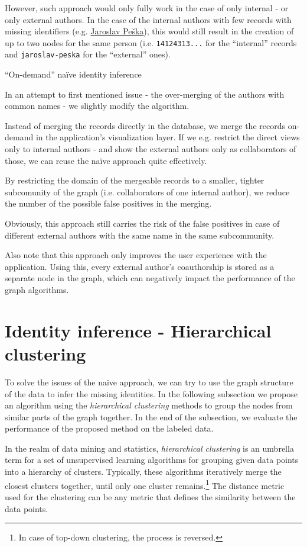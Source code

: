 However, such approach would only fully work in the case of only internal - or only external authors.
In the case of the internal authors with few records with missing identifiers (e.g. \hyperref[fig:jaroslav-peska]{Jaroslav Peška}),
this would still result in the creation of up to two nodes for the same person (i.e. \texttt{14124313...} for the ``internal'' records and \texttt{jaroslav-peska} for the ``external'' ones).

\begin{mybox}{``On-demand'' naïve identity inference}

In an attempt to first mentioned issue - the over-merging of the authors with common names - we slightly modify the algorithm.

Instead of merging the records directly in the database, we merge the records on-demand in the application's visualization layer.
If we e.g. restrict the direct views only to internal authors - and show the external authors only as collaborators of those,
we can reuse the naïve approach quite effectively.

By restricting the domain of the mergeable records to a smaller, tighter subcomunity of the graph (i.e. collaborators of one internal author), 
we reduce the number of the possible false positives in the merging.

Obviously, this approach still carries the risk of the false positives in case of different external authors with the same name in the same subcommunity.

Also note that this approach only improves the user experience with the application.
Using this, every external author's coauthorship is stored as a separate node in the graph, which can negatively impact the performance of the graph algorithms.
\end{mybox}

\section{Identity inference - Hierarchical clustering}

To solve the issues of the naïve approach, we can try to use the graph structure of the data to infer the missing identities.
In the following subsection we propose an algorithm using the \textit{hierarchical clustering} methods to group the nodes from similar parts of the graph together.
In the end of the subsection, we evaluate the performance of the proposed method on the labeled data.

In the realm of data mining and statistics, \textit{hierarchical clustering} is an umbrella term for a set of unsupervised learning algorithms for grouping
given data points into a hierarchy of clusters. Typically, these algorithms iteratively merge the closest clusters together, until only one cluster remains.\footnote{In case of top-down clustering, the process is reversed.}
The distance metric used for the clustering can be any metric that defines the similarity between the data points.

